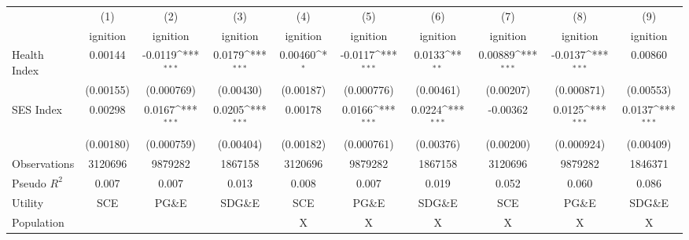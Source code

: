 {
\def\sym#1{\ifmmode^{#1}\else\(^{#1}\)\fi}
\begin{tabular}{l*{9}{c}}
\hline\hline
                    &\multicolumn{1}{c}{(1)}         &\multicolumn{1}{c}{(2)}         &\multicolumn{1}{c}{(3)}         &\multicolumn{1}{c}{(4)}         &\multicolumn{1}{c}{(5)}         &\multicolumn{1}{c}{(6)}         &\multicolumn{1}{c}{(7)}         &\multicolumn{1}{c}{(8)}         &\multicolumn{1}{c}{(9)}         \\
                    &    ignition         &    ignition         &    ignition         &    ignition         &    ignition         &    ignition         &    ignition         &    ignition         &    ignition         \\
\hline
Health Index        &     0.00144         &     -0.0119\sym{***}&      0.0179\sym{***}&     0.00460\sym{*}  &     -0.0117\sym{***}&      0.0133\sym{**} &     0.00889\sym{***}&     -0.0137\sym{***}&     0.00860         \\
                    &   (0.00155)         &  (0.000769)         &   (0.00430)         &   (0.00187)         &  (0.000776)         &   (0.00461)         &   (0.00207)         &  (0.000871)         &   (0.00553)         \\
[1em]
SES Index           &     0.00298         &      0.0167\sym{***}&      0.0205\sym{***}&     0.00178         &      0.0166\sym{***}&      0.0224\sym{***}&    -0.00362         &      0.0125\sym{***}&      0.0137\sym{***}\\
                    &   (0.00180)         &  (0.000759)         &   (0.00404)         &   (0.00182)         &  (0.000761)         &   (0.00376)         &   (0.00200)         &  (0.000924)         &   (0.00409)         \\
\hline
Observations        &     3120696         &     9879282         &     1867158         &     3120696         &     9879282         &     1867158         &     3120696         &     9879282         &     1846371         \\
Pseudo \(R^{2}\)    &       0.007         &       0.007         &       0.013         &       0.008         &       0.007         &       0.019         &       0.052         &       0.060         &       0.086         \\
Utility             &         SCE         &       PG\&E         &      SDG\&E         &         SCE         &       PG\&E         &      SDG\&E         &         SCE         &       PG\&E         &      SDG\&E         \\
Population          &                     &                     &                     &           X         &           X         &           X         &           X         &           X         &           X         \\

\end{tabular}}
